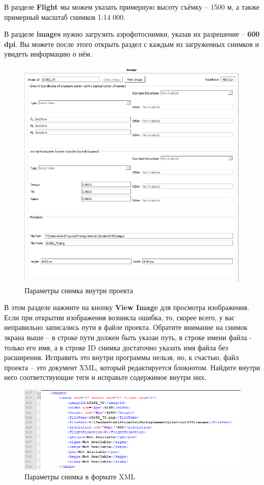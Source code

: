 \documentclass[
  12pt,
]{book}
\begin{document}
В разделе \textbf{Flight} мы можем указать примерную высоту съёмку -- 1500 м, а также примерный масштаб снимков 1:14 000.

В разделе \textbf{images} нужно загрузить аэрофотоснимки, указав их разрешение -- \textbf{600 dpi}. Вы можете после этого открыть раздел с каждым из загруженных снимков и увидеть информацию о нём.

\begin{figure}
\centering
\includegraphics{images/Ref13/Image_Properties.png}
\caption{Параметры снимка внутри проекта}
\end{figure}

В этом разделе нажмите на кнопку \textbf{View Image} для просмотра изображения. Если при открытии изображения возникла ошибка, то, скорее всего, у вас неправильно записались пути в файле проекта. Обратите внимание на снимок экрана выше -- в строке пути должен быть указан путь, в строке имени файла - только его имя, а в строке ID снимка достаточно указать имя файла без расширения. Исправить это внутри программы нельзя, но, к счастью, файл проекта -- это документ XML, который редактируется блокнотом. Найдите внутри него соответствующие теги и исправьте содержимое внутри них.

\begin{figure}
\centering
\includegraphics{images/Ref13/XML_editing.png}
\caption{Параметры снимка в формате XML}
\end{figure}
\end{document}
